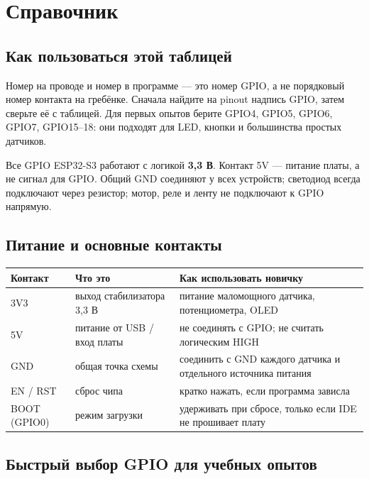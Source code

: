 \section{Справочник}
\subsection*{Как пользоваться этой таблицей}

Номер на проводе и номер в программе --- это номер GPIO, а не порядковый номер контакта на гребёнке.
Сначала найдите на pinout надпись GPIO, затем сверьте её с таблицей. Для первых опытов берите GPIO4,
GPIO5, GPIO6, GPIO7, GPIO15--18: они подходят для LED, кнопки и большинства простых датчиков.

\begin{caution}
Все GPIO ESP32-S3 работают с логикой \textbf{3,3 В}. Контакт 5V --- питание платы, а не сигнал для GPIO.
Общий GND соединяют у всех устройств; светодиод всегда подключают через резистор; мотор, реле и ленту
не подключают к GPIO напрямую.
\end{caution}

\subsection*{Питание и основные контакты}

\begin{center}\small
\begin{tabularx}{\textwidth}{@{}l X X@{}}
\toprule
Контакт & Что это & Как использовать новичку \\
\midrule
3V3 & выход стабилизатора 3,3 В & питание маломощного датчика, потенциометра, OLED \\
5V & питание от USB / вход платы & не соединять с GPIO; не считать логическим HIGH \\
GND & общая точка схемы & соединить с GND каждого датчика и отдельного источника питания \\
EN / RST & сброс чипа & кратко нажать, если программа зависла \\
BOOT (GPIO0) & режим загрузки & удерживать при сбросе, только если IDE не прошивает плату \\
\bottomrule
\end{tabularx}
\end{center}

\subsection*{Быстрый выбор GPIO для учебных опытов}

